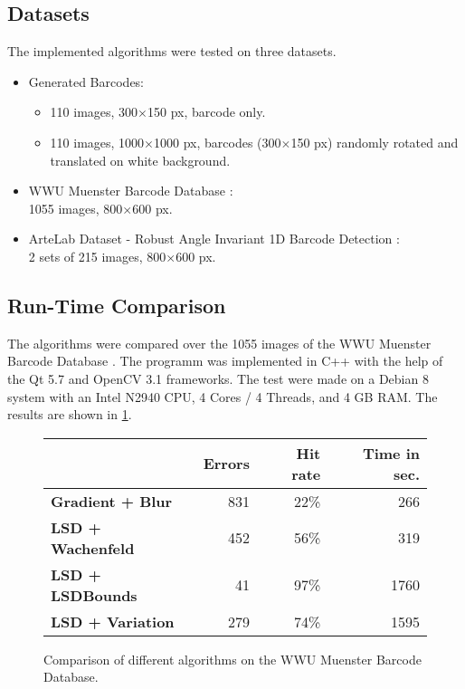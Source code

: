 \subsection{Datasets}
The implemented algorithms were tested on three datasets.
\begin{itemize}
\item Generated Barcodes:
\begin{itemize}
\item 110 images, 300$\times$150 px, barcode only.
\item 110 images, 1000$\times$1000 px, barcodes (300$\times$150 px) randomly rotated and translated on white background.
\end{itemize}
\item WWU Muenster Barcode Database \cite{MuensterBarcodeDB}\citep{wachenfeld2008robust}:\\
1055 images, 800$\times$600 px.
\item ArteLab Dataset - Robust Angle Invariant 1D Barcode Detection \cite{ArteLabDB} \cite{zamberletti2010neural} \citep{zamberletti2013robust}:\\
2 sets of 215 images, 800$\times$600 px.
\end{itemize}

\subsection{Run-Time Comparison}
The algorithms were compared over the 1055 images of the WWU Muenster Barcode Database \citep{MuensterBarcodeDB}. The programm was implemented in C++ with the help of the Qt 5.7 and OpenCV 3.1 frameworks. The test were made on a Debian 8 system with an Intel N2940 CPU, 4 Cores / 4 Threads, and 4 GB RAM. The results are shown in \cref{laufzeit}.

\begin{figure}[t]
\center
\bgroup
\def\arraystretch{1.5}
\begin{tabular}{|l|r|r|r|}
\hline
&\textbf{Errors}&\textbf{Hit rate}&\textbf{Time in sec.}\\
\hline
\textbf{Gradient + Blur}& 831& 22\%& 266\\
\hline
\textbf{LSD + Wachenfeld}& 452& 56\%& 319\\
\hline
\textbf{LSD + LSDBounds}& 41& 97\%& 1760\\
\hline
\textbf{LSD + Variation}& 279& 74\%& 1595\\
\hline
\end{tabular}
\egroup
\caption{Comparison of different algorithms on the WWU Muenster Barcode Database.}
\label{laufzeit}
\end{figure}
 